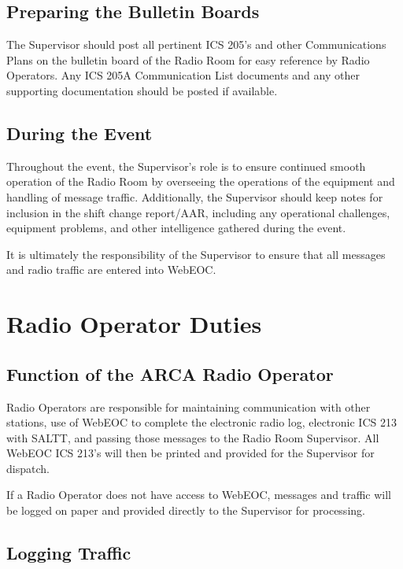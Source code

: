 \documentclass[pdflatex,letterpaper,twoside,12pt]{book}
\begin{document}
\subsection{Preparing the Bulletin Boards}

The Supervisor should post all pertinent ICS 205's and other Communications Plans on the bulletin board of the Radio Room for easy reference by Radio Operators.  Any ICS 205A Communication List documents and any other supporting documentation should be posted if available.

\subsection{During the Event}

Throughout the event, the Supervisor's role is to ensure continued smooth operation of the Radio Room by overseeing the operations of the equipment and handling of message traffic.  Additionally, the Supervisor should keep notes for inclusion in the shift change report/AAR, including any operational challenges, equipment problems, and other intelligence gathered during the event.

It is ultimately the responsibility of the Supervisor to ensure that all messages and radio traffic are entered into WebEOC.


\section{Radio Operator Duties}

\subsection{Function of the ARCA Radio Operator}

Radio Operators are responsible for maintaining communication with other stations, use of WebEOC to complete the electronic radio log, electronic ICS 213 with SALTT, and passing those messages to the Radio Room Supervisor.  All WebEOC ICS 213's will then be printed and provided for the Supervisor for dispatch.

If a Radio Operator does not have access to WebEOC, messages and traffic will be logged on paper and provided directly to the Supervisor for processing.

\subsection{Logging Traffic}
\end{document}
